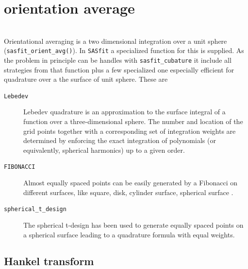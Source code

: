 \section{orientation average} ~\\

Orientational averaging is a two dimensional integration over a unit sphere (\texttt{sasfit\_orient\_avg()}). In \texttt{SASfit} a specialized function for this is supplied. As the problem in principle can be handles with \texttt{sasfit\_cubature} it include all strategies from that function plus a few specialized one especially efficient for quadrature over a the surface of unit sphere. These are
\begin{description}
\item[\texttt{Lebedev}] Lebedev quadrature \cite{WikiLebedevQuad2024,Lebedev1975,Lebedev1976,Lebedev1977,Lebedev2003} is an approximation to the surface integral of a function over a three-dimensional sphere. The number and location of the grid points together with a corresponding set of integration weights are determined by enforcing the exact integration of polynomials (or equivalently, spherical harmonics) up to a given order.
\item[\texttt{FIBONACCI}]  Almost equally spaced points can be easily generated by a Fibonacci on different surfaces, like square, disk, cylinder surface, spherical surface \cite{Marques_2013,Swinbank2006}.
\item[\texttt{spherical\_t\_design}] The spherical t-design \cite{WikipediaSphericalDesign2024,Graef2011,Hardin1996} has been used to generate equally spaced points on a spherical surface leading to a quadrature formula with equal weights.
\end{description}

\subsection{Hankel transform} ~\\

